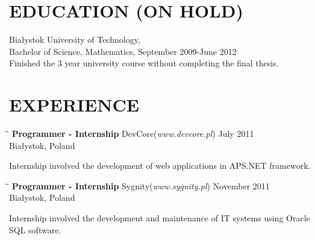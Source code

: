 \documentclass{res}
\begin{document}
\begin{resume}
\section{EDUCATION (ON HOLD)}
	Białystok University of Technology, \\
	Bachelor of Science, Mathematics, September 2009-June 2012 \\
	Finished the 3 year university course without completing the final thesis.
\section{EXPERIENCE}
   \vspace{-0.1in}	

   \begin{tabbing}
   \hspace{2.3in}\= \hspace{2.6in}\= \kill %
    {\bf Programmer - Internship} \>DevCore(\textit{www.devcore.pl}) \>July 2011\\
                             \>Białystok, Poland
   \end{tabbing}\vspace{-20pt}      %
   Internship involved the development of web applications in APS.NET framework.

   \begin{tabbing}
   \hspace{2.3in}\= \hspace{2.6in}\= \kill %
    {\bf Programmer - Internship} \>Sygnity(\textit{www.sygnity.pl}) \>November 2011\\
                             \>Białystok, Poland
   \end{tabbing}\vspace{-20pt}      %
   Internship involved the development and maintenance of IT systems using Oracle SQL software.


\end{resume}
\end{document}

